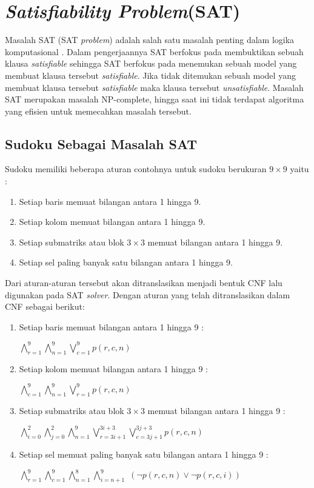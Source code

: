 \section{\textit{Satisfiability Problem}(SAT)}

Masalah SAT (SAT \textit{problem}) adalah salah satu masalah penting dalam logika komputasional \cite{huth2004logic}. Dalam pengerjaannya SAT berfokus pada membuktikan sebuah klausa \textit{satisfiable} sehingga SAT berfokus pada menemukan sebuah model yang membuat klausa tersebut \textit{satisfiable}. Jika tidak ditemukan sebuah model yang membuat klausa tersebut \textit{satisfiable} maka klausa tersebut \textit{unsatisfiable}. Masalah SAT merupakan masalah NP-complete, hingga saat ini tidak
terdapat algoritma yang efisien untuk memecahkan masalah tersebut. 

\subsection{Sudoku Sebagai Masalah SAT}
Sudoku memiliki beberapa aturan contohnya untuk sudoku berukuran  $9 \times 9$ yaitu :

\begin{enumerate}
	\item Setiap baris memuat bilangan antara 1 hingga 9.
	\item Setiap kolom memuat bilangan antara 1 hingga 9.
	\item Setiap submatriks atau blok $3 \times 3$
	 memuat bilangan antara 1 hingga 9.
	\item Setiap sel paling banyak satu bilangan antara 1 hingga 9.
\end{enumerate}

Dari aturan-aturan tersebut akan ditranslasikan menjadi bentuk CNF lalu digunakan pada SAT \textit{solver}. Dengan aturan yang telah ditranslasikan dalam CNF sebagai berikut:

\begin{enumerate}
	\item Setiap baris memuat bilangan antara 1 
	hingga 9 : 
	
	$\bigwedge_{r=1}^{9}$$\bigwedge_{n=1}^{9}$$\bigvee_{c=1}^{9}$$p\left(r,c,n\right)$
	
	\item Setiap kolom memuat bilangan antara 1 hingga 9 : 
	
	$\bigwedge_{c=1}^{9}$$\bigwedge_{n=1}^{9}$$\bigvee_{r=1}^{9}$$p\left(r,c,n\right)$
	
	\item Setiap submatriks atau blok $3 \times 3$
	memuat bilangan antara 1 hingga 9 : 
	
	$\bigwedge_{i=0}^{2}$$\bigwedge_{j=0}^{2}$$\bigwedge_{n=1}^{9}$$\bigvee_{r=3i+1}^{3i+3}$$\bigvee_{c=3j+1}^{3j+3}$$p\left(r,c,n\right)$
	
	\item Setiap sel memuat paling banyak satu bilangan antara 1 hingga 9 : 
	
	$\bigwedge_{r=1}^{9}$$\bigwedge_{c=1}^{9}$$\bigwedge_{n=1}^{8}$$\bigwedge_{i=n+1}^{9}$
	$\left(\neg p\left(r,c,n\right)\vee\neg p\left(r,c,i\right)\right)$
	
\end{enumerate}

